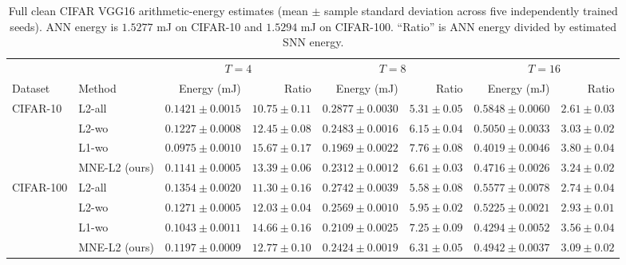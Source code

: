 \documentclass{article}
\begin{document}
\begin{table}[t]
\caption{Full clean CIFAR VGG16 arithmetic-energy estimates (mean $\pm$ sample standard deviation across five independently trained seeds). ANN energy is $1.5277$ mJ on CIFAR-10 and $1.5294$ mJ on CIFAR-100. ``Ratio'' is ANN energy divided by estimated SNN energy.}
\label{tab:cifar-energy-full}
\centering
\scriptsize
\setlength{\tabcolsep}{2.2pt}
\begin{tabular}{llrrrrrr}
\toprule
& & \multicolumn{2}{c}{$T=4$} & \multicolumn{2}{c}{$T=8$} & \multicolumn{2}{c}{$T=16$} \\
Dataset & Method & Energy (mJ) & Ratio & Energy (mJ) & Ratio & Energy (mJ) & Ratio \\
\midrule
CIFAR-10 & L2-all & $0.1421\pm0.0015$ & $10.75\pm0.11$ & $0.2877\pm0.0030$ & $5.31\pm0.05$ & $0.5848\pm0.0060$ & $2.61\pm0.03$ \\
         & L2-wo  & $0.1227\pm0.0008$ & $12.45\pm0.08$ & $0.2483\pm0.0016$ & $6.15\pm0.04$ & $0.5050\pm0.0033$ & $3.03\pm0.02$ \\
         & L1-wo  & $0.0975\pm0.0010$ & $15.67\pm0.17$ & $0.1969\pm0.0022$ & $7.76\pm0.08$ & $0.4019\pm0.0046$ & $3.80\pm0.04$ \\
         & MNE-L2 (ours) & $0.1141\pm0.0005$ & $13.39\pm0.06$ & $0.2312\pm0.0012$ & $6.61\pm0.03$ & $0.4716\pm0.0026$ & $3.24\pm0.02$ \\
\midrule
CIFAR-100 & L2-all & $0.1354\pm0.0020$ & $11.30\pm0.16$ & $0.2742\pm0.0039$ & $5.58\pm0.08$ & $0.5577\pm0.0078$ & $2.74\pm0.04$ \\
          & L2-wo  & $0.1271\pm0.0005$ & $12.03\pm0.04$ & $0.2569\pm0.0010$ & $5.95\pm0.02$ & $0.5225\pm0.0021$ & $2.93\pm0.01$ \\
          & L1-wo  & $0.1043\pm0.0011$ & $14.66\pm0.16$ & $0.2109\pm0.0025$ & $7.25\pm0.09$ & $0.4294\pm0.0052$ & $3.56\pm0.04$ \\
          & MNE-L2 (ours) & $0.1197\pm0.0009$ & $12.77\pm0.10$ & $0.2424\pm0.0019$ & $6.31\pm0.05$ & $0.4942\pm0.0037$ & $3.09\pm0.02$ \\
\bottomrule
\end{tabular}
\end{table}
\end{document}
